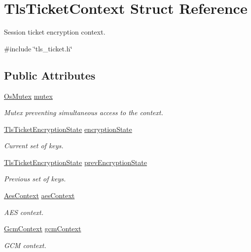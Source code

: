 \hypertarget{structTlsTicketContext}{}\section{Tls\+Ticket\+Context Struct Reference}
\label{structTlsTicketContext}


Session ticket encryption context.  




{\ttfamily \#include \char`\"{}tls\+\_\+ticket.\+h\char`\"{}}

\subsection*{Public Attributes}
\begin{DoxyCompactItemize}
\item 
\hyperlink{structOsMutex}{Os\+Mutex} \hyperlink{structTlsTicketContext_a849eb29051bd12f969adf692adcf77a1}{mutex}
\begin{DoxyCompactList}\small\item\em Mutex preventing simultaneous access to the context. \end{DoxyCompactList}\item 
\hyperlink{structTlsTicketEncryptionState}{Tls\+Ticket\+Encryption\+State} \hyperlink{structTlsTicketContext_a17718f312fa71bf90c3b046e44bf160e}{encryption\+State}
\begin{DoxyCompactList}\small\item\em Current set of keys. \end{DoxyCompactList}\item 
\hyperlink{structTlsTicketEncryptionState}{Tls\+Ticket\+Encryption\+State} \hyperlink{structTlsTicketContext_a198a1a46a74ce01b4a1fd44671c053c1}{prev\+Encryption\+State}
\begin{DoxyCompactList}\small\item\em Previous set of keys. \end{DoxyCompactList}\item 
\hyperlink{structAesContext}{Aes\+Context} \hyperlink{structTlsTicketContext_a79e7955202ca564487149653daf99272}{aes\+Context}
\begin{DoxyCompactList}\small\item\em A\+ES context. \end{DoxyCompactList}\item 
\hyperlink{structGcmContext}{Gcm\+Context} \hyperlink{structTlsTicketContext_a9dccce1f6388c835956bf82a3f4c0d3c}{gcm\+Context}
\begin{DoxyCompactList}\small\item\em G\+CM context. \end{DoxyCompactList}\end{DoxyCompactItemize}


